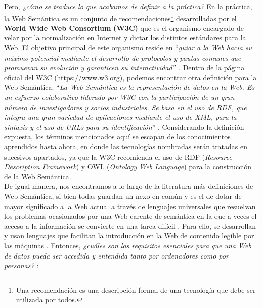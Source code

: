 Pero, \textit{¿cómo se traduce lo que acabamos de definir a la práctica?} En la práctica, la Web Semántica es un conjunto de recomendaciones\footnote{Una recomendación es una descripción formal de una tecnología que debe ser utilizada por todos.} desarrolladas por el \textbf{World Wide Web Consortium}\textbf{ (W3C) }que es el organismo encargado de velar por la normalización en Internet y dictar los distintos estándares para la Web. El objetivo principal de este organismo reside en ``\textit{guiar a la Web hacia su máximo potencial mediante el desarrollo de protocolos y pautas comunes que promuevan su evolución y garanticen su interactividad}’’ \cite{coursera, web-semantica-w3c}. Dentro de la página oficial del W3C (\url{https://www.w3.org}), podemos encontrar otra definición para la Web Semántica: ``\textit{La Web Semántica es la representación de datos en la Web. Es un esfuerzo colaborativo liderado por W3C con la participación de un gran número de investigadores y socios industriales. Se basa en el uso de RDF, que integra una gran variedad de aplicaciones mediante el uso de XML, para la sintaxis y el uso de URLs para su identificación}'' \cite{semantica-web}. Considerando la definición expuesta, los términos mencionados aquí se escapan de los conocimientos aprendidos hasta ahora, en donde las tecnologías nombradas serán tratadas en sucesivos apartados, ya que la W3C recomienda el uso de RDF (\textit{Resource Description Framework}) y OWL (\textit{Ontology Web Language}) para la construcción de la Web Semántica.\\

De igual manera, nos encontramos a lo largo de la literatura más definiciones de Web Semántica, si bien todas guardan un nexo en común y es el de dotar de mayor significado a la Web actual a través de lenguajes universales que resuelvan los problemas ocasionados por una Web carente de semántica en la que a veces el acceso a la información se convierte en una tarea difícil \cite{introduccion}. Para ello, se desarrollan y usan lenguajes que facilitan la introducción en la Web de contenido legible por las máquinas \cite{tesis}. Entonces, \textit{¿cuáles son los requisitos esenciales para que una Web de datos pueda ser accedida y entendida tanto por ordenadores como por personas?} \cite{coursera}:

